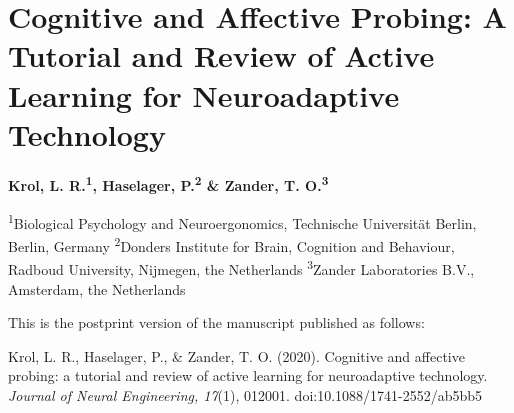 
\chapter{Cognitive and Affective Probing: A Tutorial and Review of Active Learning for Neuroadaptive Technology}
%
\label{chapter:cp}%


{\chaptermeta 

\textbf{Krol, L. R.\textsuperscript{1}, Haselager, P.\textsuperscript{2} \& Zander, T. O.\textsuperscript{3}}

{\small
\textsuperscript{1}Biological Psychology and Neuroergonomics, Technische Universität Berlin, Berlin, Germany
\textsuperscript{2}Donders Institute for Brain, Cognition and Behaviour, Radboud University, Nijmegen, the Netherlands
\textsuperscript{3}Zander Laboratories B.V., Amsterdam, the Netherlands

This is the postprint version of the manuscript published as follows:

Krol, L. R., Haselager, P., \& Zander, T. O. (2020). Cognitive and affective probing: a tutorial and review of active learning for neuroadaptive technology. \emph{Journal of Neural Engineering, 17}(1), 012001. doi:10.1088/1741-2552/ab5bb5\nocite{krol2020cognitiveprobing}
\par}}


